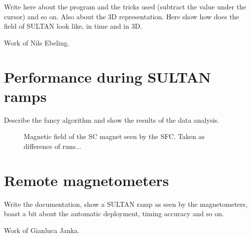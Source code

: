 Write here about the program and the tricks used (subtract the value under the cursor) and so on. Also about the 3D representation. Here show how does the field of SULTAN look like, in time and in 3D.

Work of Nils Ebeling.


\section{Performance during SULTAN ramps}
Describe the fancy algorithm and show the results of the data analysis.

\begin{figure}[bth]
  \myfloatalign
  \quad
  \caption{Magnetic field of the SC magnet seen by the SFC. Taken as difference of runs...}
\end{figure}



\section{Remote magnetometers}
Write the documentation, show a SULTAN ramp as seen by the magnetometers, boast a bit about the automatic deployment, timing accuracy and so on.

Work of Gianluca Janka.
